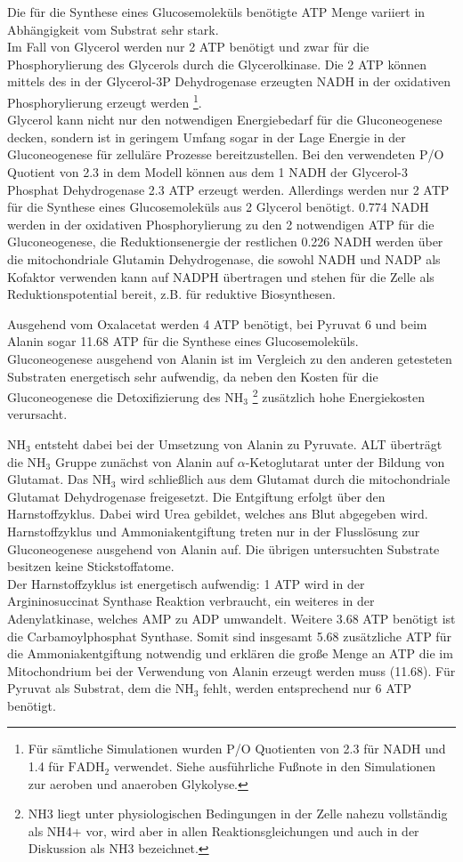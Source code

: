 Die für die Synthese eines Glucosemoleküls benötigte ATP Menge variiert in Abhängigkeit vom Substrat sehr stark.\\
Im Fall von Glycerol werden nur 2 ATP benötigt und zwar für die Phosphorylierung des Glycerols durch die Glycerolkinase. Die 2 ATP können mittels des in der Glycerol-3P Dehydrogenase erzeugten NADH in der oxidativen Phosphorylierung erzeugt werden \footnote{Für sämtliche Simulationen wurden P/O Quotienten von 2.3 für NADH und 1.4 für $\text{FADH}_2$ verwendet. Siehe ausführliche Fußnote in den Simulationen zur aeroben und anaeroben Glykolyse.}.\\
Glycerol kann nicht nur den notwendigen Energiebedarf für die Gluconeogenese decken, sondern ist in geringem Umfang sogar in der Lage Energie in der Gluconeogenese für zelluläre Prozesse bereitzustellen. Bei den verwendeten P/O Quotient von 2.3 in dem Modell können aus dem 1 NADH der Glycerol-3 Phosphat Dehydrogenase 2.3 ATP erzeugt werden. Allerdings werden nur 2 ATP für die Synthese eines Glucosemoleküls aus 2 Glycerol benötigt. 0.774 NADH werden in der oxidativen Phosphorylierung zu den 2 notwendigen ATP für die Gluconeogenese, die Reduktionsenergie der restlichen 0.226 NADH werden über die mitochondriale Glutamin Dehydrogenase, die sowohl NADH und NADP als Kofaktor verwenden kann auf NADPH übertragen und stehen für die Zelle als Reduktionspotential bereit, z.B. für reduktive Biosynthesen.

Ausgehend vom Oxalacetat werden 4 ATP benötigt, bei Pyruvat 6 und beim Alanin sogar 11.68 ATP für die Synthese eines Glucosemoleküls.\\
Gluconeogenese ausgehend von Alanin ist im Vergleich zu den anderen getesteten Substraten energetisch sehr aufwendig, da neben den Kosten für die Gluconeogenese die Detoxifizierung des $\text{NH}_3$ 
\footnote{NH3 liegt unter physiologischen Bedingungen in der Zelle nahezu vollständig als NH4+ vor, wird aber in allen Reaktionsgleichungen und auch in der Diskussion als NH3 bezeichnet.}
zusätzlich hohe Energiekosten verursacht.

$\text{NH}_3$ entsteht dabei bei der Umsetzung von Alanin zu Pyruvate. ALT überträgt die $\text{NH}_3$ Gruppe zunächst von Alanin auf $\alpha$-Ketoglutarat unter der Bildung von Glutamat. Das $\text{NH}_3$ wird schließlich aus dem Glutamat durch die mitochondriale Glutamat Dehydrogenase freigesetzt. Die Entgiftung erfolgt über den Harnstoffzyklus. Dabei wird Urea gebildet, welches ans Blut abgegeben wird. Harnstoffzyklus und Ammoniakentgiftung treten nur in der Flusslösung zur Gluconeogenese ausgehend von Alanin auf. Die übrigen untersuchten Substrate besitzen keine Stickstoffatome.\\ 
Der Harnstoffzyklus ist energetisch aufwendig: 1 ATP wird in der Argininosuccinat Synthase Reaktion verbraucht, ein weiteres in der Adenylatkinase, welches AMP zu ADP umwandelt. Weitere 3.68 ATP benötigt ist die Carbamoylphosphat Synthase. Somit sind insgesamt 5.68 zusätzliche ATP für die Ammoniakentgiftung notwendig und erklären die große Menge an ATP die im Mitochondrium bei der Verwendung von Alanin erzeugt werden muss (11.68). Für Pyruvat als Substrat, dem die $\text{NH}_3$ fehlt, werden entsprechend nur 6 ATP benötigt.

